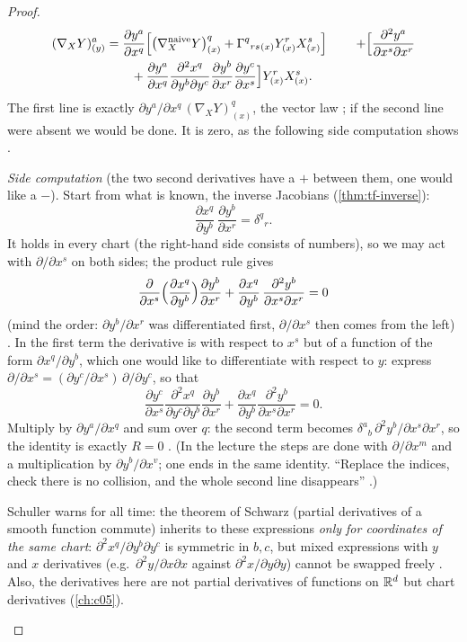 \begin{paracol}{2}
\begin{proof}
\begin{align*}
  (\nabla_XY)^a_{(y)}
  &=\frac{\partial y^a}{\partial x^q}\Bigl[\bigl(\nabla^{\text{naive}}_XY\bigr)^q_{(x)}+\Gamma^q{}_{rs}{}_{(x)}Y^r_{(x)}X^s_{(x)}\Bigr]\
  &\quad+\Bigl[\frac{\partial^2y^a}{\partial x^s\partial x^r}\\
  &\qquad+\frac{\partial y^a}{\partial x^q}\frac{\partial^2x^q}{\partial y^b\partial y^c}\frac{\partial y^b}{\partial x^r}\frac{\partial y^c}{\partial x^s}\Bigr]Y^r_{(x)}X^s_{(x)} .
\end{align*}
The first line is exactly $\partial y^a/\partial x^q\,(\nabla_XY)^q_{(x)}$, the vector law ; if the second line were
absent we would be done. It is zero, as the following side computation shows \ts{6}{1}{1:09:31}.

\emph{Side computation} (the two second derivatives have a $+$ between them, one would like a $-$). Start from what is known, the
inverse Jacobians (\cref{thm:tf-inverse}):
\[
  \frac{\partial x^q}{\partial y^b}\,\frac{\partial y^b}{\partial x^r}=\delta^q{}_r .
\]
It holds in every chart (the right-hand side consists of numbers), so we may act with $\partial/\partial x^s$ on both sides; the
product rule gives
\[
  \frac{\partial}{\partial x^s}\Bigl(\frac{\partial x^q}{\partial y^b}\Bigr)\frac{\partial y^b}{\partial x^r}
  +\frac{\partial x^q}{\partial y^b}\,\frac{\partial^2y^b}{\partial x^s\partial x^r}=0
\]
(mind the order: $\partial y^b/\partial x^r$ was differentiated first, $\partial/\partial x^s$ then comes from the left)
\ts{6}{1}{1:10:32}.
In the first term the derivative is with respect to $x^s$ but of a function of the form $\partial x^q/\partial y^b$, which one
would like to differentiate with respect to $y$: express $\partial/\partial x^s=(\partial y^c/\partial x^s)\,\partial/\partial y^c$, so that
\[
  \frac{\partial y^c}{\partial x^s}\frac{\partial^2x^q}{\partial y^c\partial y^b}\frac{\partial y^b}{\partial x^r}
  +\frac{\partial x^q}{\partial y^b}\frac{\partial^2y^b}{\partial x^s\partial x^r}=0 .
\]
Multiply by $\partial y^a/\partial x^q$ and sum over $q$: the second term becomes $\delta^a{}_b\,\partial^2y^b/\partial x^s\partial x^r$, so
the identity is exactly $R=0$ \ts{6}{1}{1:15:47}. (In the lecture the steps are done with $\partial/\partial x^m$ and a multiplication by
$\partial y^b/\partial x^v$; one ends in the same identity. ``Replace the indices, check there is no collision, and the whole second line
disappears'' \ts{6}{1}{1:16:51}.)

\begin{coursenote}
Schuller warns for all time: the theorem of Schwarz (partial derivatives of a smooth function commute) inherits to these expressions
\emph{only for coordinates of the same chart}: $\partial^2x^q/\partial y^b\partial y^c$ is symmetric in $b,c$, but mixed expressions with
$y$ and $x$ derivatives (e.g.\ $\partial^2y/\partial x\partial x$ against $\partial^2x/\partial y\partial y$) cannot be swapped freely
\ts{6}{1}{1:12:58}. Also, the derivatives here are not partial derivatives of functions on $\mathbb{R}^d$ but chart derivatives
(\cref{ch:c05}).
\end{coursenote}


\end{proof}
\end{paracol}
